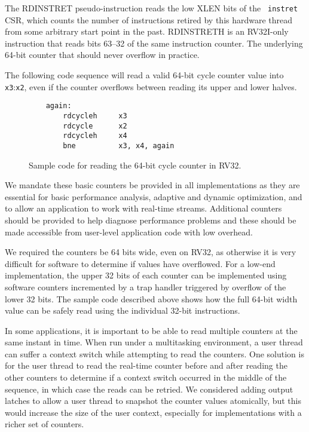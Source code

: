 The RDINSTRET pseudo-instruction reads the low XLEN bits of the {\tt
  instret} CSR, which counts the number of instructions retired by
this hardware thread from some arbitrary start point in the past.
RDINSTRETH is an RV32I-only instruction that reads bits 63--32 of the
same instruction counter. The underlying 64-bit counter that should
never overflow in practice.

The following code sequence will read a valid 64-bit cycle counter value into
{\tt x3}:{\tt x2}, even if the counter overflows between reading its upper
and lower halves.

\begin{figure}[h!]
\begin{center}
\begin{verbatim}
    again:
        rdcycleh     x3
        rdcycle      x2
        rdcycleh     x4
        bne          x3, x4, again
\end{verbatim}
\end{center}
\caption{Sample code for reading the 64-bit cycle counter in RV32.}
\label{critical}
\end{figure}

\begin{commentary}
We mandate these basic counters be provided in all implementations as
they are essential for basic performance analysis, adaptive and
dynamic optimization, and to allow an application to work with
real-time streams.  Additional counters should be provided to help
diagnose performance problems and these should be made accessible from
user-level application code with low overhead.

We required the counters be 64 bits wide, even on RV32, as otherwise
it is very difficult for software to determine if values have
overflowed.  For a low-end implementation, the upper 32 bits of each
counter can be implemented using software counters incremented by a
trap handler triggered by overflow of the lower 32 bits.  The sample
code described above shows how the full 64-bit width value can be
safely read using the individual 32-bit instructions.

In some applications, it is important to be able to read multiple
counters at the same instant in time.  When run under a multitasking
environment, a user thread can suffer a context switch while
attempting to read the counters.  One solution is for the user thread
to read the real-time counter before and after reading the other
counters to determine if a context switch occurred in the middle of the
sequence, in which case the reads can be retried.  We considered
adding output latches to allow a user thread to snapshot the counter
values atomically, but this would increase the size of the user
context, especially for implementations with a richer set of counters.
\end{commentary}


